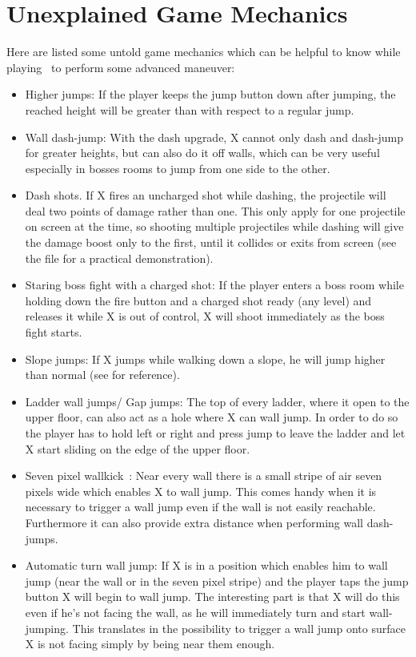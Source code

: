 \section{Unexplained Game Mechanics}\label{X1:game_mechanics}
Here are listed some untold game mechanics which can be helpful to know while playing~\cite{RTA_wiki:X1} to perform some advanced maneuver: 
\begin{itemize}
	\item Higher jumps: If the player keeps the jump button down after jumping, the reached height will be greater than with respect to a regular jump.
	
	\item Wall dash-jump: With the dash upgrade, X cannot only dash and dash-jump for greater heights, but can also do it off walls, which can be very useful especially in bosses rooms to jump from one side to the other.
	
	\item Dash shots. If X fires an uncharged shot while dashing, the projectile will deal two points of damage rather than one. This only apply for one projectile on screen at the time, so shooting multiple projectiles while dashing will give the damage boost only to the first, until it collides or exits from screen (see the file  for a practical demonstration).
	
	\item Staring boss fight with a charged shot: If the player enters a boss room while holding down the fire button and a charged shot ready (any level) and releases it while X is out of control, X will shoot immediately as the boss fight starts.
	
	\item Slope jumps: If X jumps while walking down a slope, he will jump higher than normal (see  for reference).
	
	\item Ladder wall jumps/ Gap jumps: The top of every ladder, where it open to the upper floor, can also act as a hole where X can wall jump. In order to do so the player has to hold left or right and press jump to leave the ladder and let X start sliding on the edge of the upper floor.
	
	\item Seven pixel wallkick~\cite{MMX_RTA_wiki:basics}: Near every wall there is a small stripe of air seven pixels wide which enables X to wall jump. This comes handy when it is necessary to trigger a wall jump even if the wall is not easily reachable. Furthermore it can also provide extra distance when performing wall dash-jumps.
	
	\item Automatic turn wall jump: If X is in a position which enables him to wall jump (near the wall or in the seven pixel stripe) and the player taps the jump button X will begin to wall jump. The interesting part is that X will do this even if he's not facing the wall, as he will immediately turn and start wall-jumping. This translates in the possibility to trigger a wall jump onto surface X is not facing simply by being near them enough.
\end{itemize}

